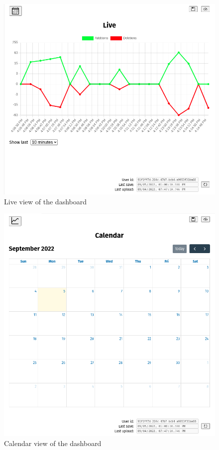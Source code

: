 \begin{figure}[htbp]
  \centering
  \includegraphics[scale=0.5]{chapters/live-view.png}
  \caption{Live view of the dashboard}
\end{figure}

\begin{figure}[htbp]
  \centering
  \includegraphics[scale=0.5]{chapters/calendar-view.png}
  \caption{Calendar view of the dashboard}
\end{figure}

